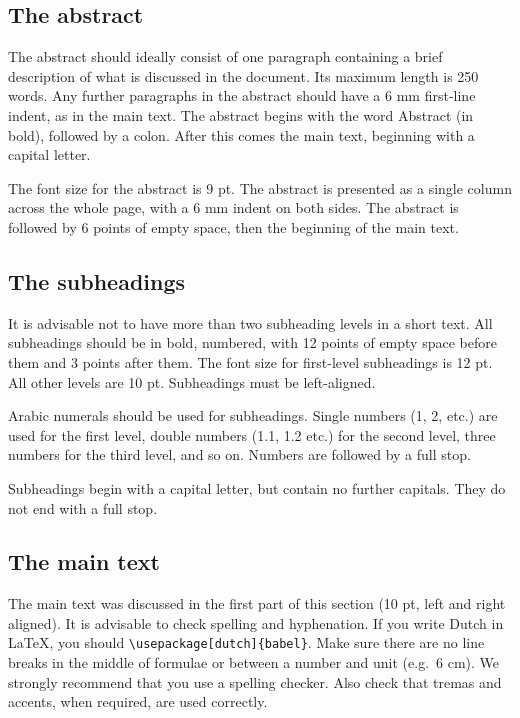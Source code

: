\subsection{The abstract}\label{sec:_abstract_layout}
The abstract should ideally consist of one paragraph containing a brief description of what is discussed in the document.
Its maximum length is 250 words.
Any further paragraphs in the abstract should have a 6 mm first-line indent, as in the main text.
The abstract begins with the word Abstract (in bold), followed by a colon.
After this comes the main text, beginning with a capital letter.

The font size for the abstract is 9 pt.
The abstract is presented as a single column across the whole page, with a 6 mm indent on both sides.
The abstract is followed by 6 points of empty space, then the beginning of the main text.

\subsection{The subheadings}\label{sec:_the_subeadings}
It is advisable not to have more than two subheading levels in a short text.
All subheadings should be in bold, numbered, with 12 points of empty space before them and 3 points after them.
The font size for first-level subheadings is 12 pt.
All other levels are 10 pt.
Subheadings must be left-aligned.

Arabic numerals should be used for subheadings.
Single numbers (1, 2, etc.) are used for the first level, double numbers (1.1, 1.2 etc.) for the second level, three numbers for the third level, and so on.
Numbers are followed by a full stop.

Subheadings begin with a capital letter, but contain no further capitals.
They do not end with a full stop.

\subsection{The main text}\label{sec:_the_main_text}
The main text was discussed in the first part of this section (10 pt, left and right aligned).
It is advisable to check spelling and hyphenation.
If you write Dutch in \LaTeX, you should \verb|\usepackage[dutch]{babel}|.
Make sure there are no line breaks in the middle of formulae or between a number and unit (e.g.\ 6 cm).
We strongly recommend that you use a spelling checker.
Also check that tremas and accents, when required, are used correctly.

